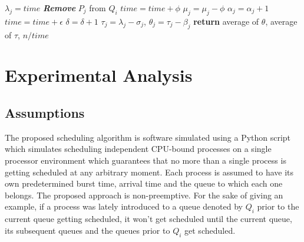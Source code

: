 \documentclass[conference]{IEEEtran}
\begin{document}
\begin{algorithm}[H]
\begin{algorithmic}[1]
                        \State $\lambda_{j} = time$
                        \State \textit{\textbf{Remove}} $P_{j}$ from $Q_{i}$
                    \Else
                        \State $time = time + \phi$
                        \State $\mu_{j} = \mu_{j} - \phi$
                            \State $\alpha_{j} = \alpha_{j} + 1$
                        \EndIf
                    \EndIf
                        \State $time = time + \epsilon$
                        \State $\delta = \delta + 1$
                    \EndIf
                \EndFor
                \algrenewcommand{}
            \EndFor
        \EndWhile
            $\tau_{j} = \lambda_{j} - \sigma_{j}$, $\theta_{j} = \tau_{j} - \beta_{j}$
        \EndFor
        \State \textbf{return} average of $\theta$, average of $\tau$, $n/time$
        \EndProcedure
    \end{algorithmic}
\end{algorithm}


\section{Experimental Analysis}


\subsection{Assumptions}

The proposed scheduling algorithm is software simulated using a Python script which simulates scheduling independent CPU-bound processes on a single processor environment which guarantees that no more than a single process is getting scheduled at any arbitrary moment. Each process is assumed to have its own predetermined burst time, arrival time and the queue to which each one belongs. The proposed approach is non-preemptive. For the sake of giving an example, if a process was lately introduced to a queue denoted by $Q_{i}$ prior to the current queue getting scheduled, it won't get scheduled until the current queue, its subsequent queues and the queues prior to $Q_{i}$ get scheduled.
\end{document}
